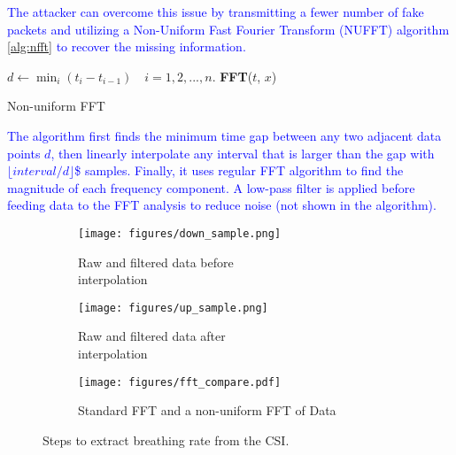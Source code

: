 \textcolor{blue}{The attacker can overcome this issue by transmitting a fewer number of fake packets and utilizing a Non-Uniform Fast Fourier Transform (NUFFT) algorithm \ref{alg:nfft} to recover the missing information.}
\begin{algorithm}
\SetAlgoLined
{}
 $d \leftarrow \min_i({t_i - t_{i - 1}}) \quad i = 1, 2, ..., n.$\;
 \Return \textbf{FFT}($t$, $x$)
 \caption{Non-uniform FFT}
 \label{alg:nfft}
\end{algorithm}

\textcolor{blue}{The algorithm first finds the minimum time gap between any two adjacent data points $d$, then linearly interpolate any interval that is larger than the gap with $\lfloor interval / d \rfloor$\$ samples. Finally, it uses regular FFT algorithm to find the magnitude of each frequency component. A low-pass filter is applied before feeding data to the FFT analysis to reduce noise (not shown in the algorithm). }

\begin{figure*}[!t]
    \centering
    \begin{subfigure}[b]{0.33\textwidth}
        \centering 
        \texttt{[image: figures/down\_sample.png]}
        \caption{Raw and filtered data before \\ interpolation}
    \end{subfigure}
    \begin{subfigure}[b]{0.33\textwidth}
        \centering
        \texttt{[image: figures/up\_sample.png]}
        \caption{Raw and filtered data after \\ interpolation}
    \end{subfigure}
        \begin{subfigure}[b]{0.33\textwidth}
        \centering
        \texttt{[image: figures/fft\_compare.pdf]}
        \caption{Standard FFT and a non-uniform FFT of Data}
    \end{subfigure}
    \caption{Steps to extract breathing rate from the CSI.}
    \label{fig:process-steps}
\end{figure*}

